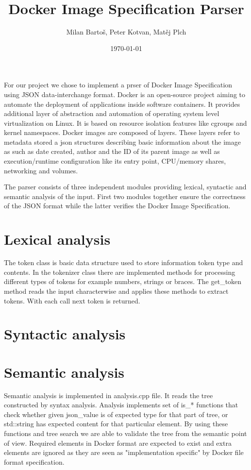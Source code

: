\documentclass[paper=a4, fontsize=11pt, abstract=on]{scrartcl} %
\title{
\normalfont \normalsize
\LARGE Docker Image Specification Parser \\
}
\author{\normalsize Milan Bartoš, Peter Kotvan, Matěj Plch} %
\date{\normalsize\today} %
\numberwithin{equation}{section} %
\numberwithin{figure}{section} %
\numberwithin{table}{section} %
\begin{document}
\maketitle %

For our project we chose to implement a prser of Docker Image Specification
using JSON data-interchange format. Docker is an open-source project aiming to
automate the deployment of applications inside software containers. It provides
additional layer of abstraction and automation of operating system level
virtualization on Linux. It is based on resource isolation features like cgroups
and kernel namespaces. Docker images are composed of layers. These layers refer
to metadata stored a json structures describing basic information about the
image as such as date created, author and the ID of its parent image as well as
execution/runtime configuration like its entry point, CPU/memory shares,
networking and volumes.

The parser consists of three independent modules providing lexical, syntactic
and semantic analysis of the input. First two modules together ensure the
correctness of the JSON format while the latter verifies the Docker Image
Specification.

\section{Lexical analysis}

The token class is basic data structure used to store information token type and
contents. In the tokenizer class there are implemented methods for processing
different types of tokens for example numbers, strings or braces. The get\_token
method reads the input characterwise and applies these methods to extract
tokens. With each call next token is returned.

\section{Syntactic analysis}


\section{Semantic analysis}

Semantic analysis is implemented in analysis.cpp file. It reads the tree constructed by syntax analysis. Analysis implements set of is\_* functions that check whether given json\_value is of expected type for that part of tree, or std::string has expected content for that particular element. By using these functions and tree search we are able to validate the tree from the semantic point of view. Required elements in Docker format are expected to exist and extra elements are ignored as they are seen as "implementation specific" by Docker file format specification.
\end{document}
